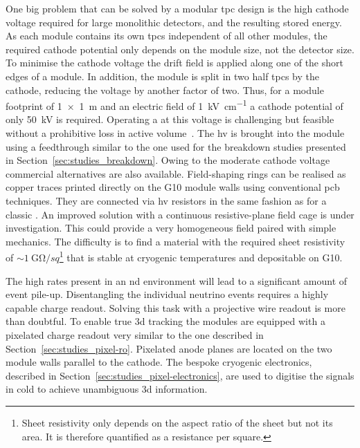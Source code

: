 One big problem that can be solved by a modular \gls{tpc} design is the high cathode voltage required for large monolithic detectors, and the resulting stored energy.
As each module contains its own \glspl{tpc} independent of all other modules, the required cathode potential only depends on the module size, not the detector size.
To minimise the cathode voltage the drift field is applied along one of the short edges of a module.
In addition, the module is split in two half \glspl{tpc} by the cathode, reducing the voltage by another factor of two.
Thus, for a module footprint of \SI{1 x 1}{\metre} and an electric field of \SI{1}{\kilo\volt\per\centi\metre} a cathode potential of only \SI{50}{\kilo\volt} is required.
Operating a \lartpc{} at this voltage is challenging but feasible without a prohibitive loss in active volume~\cite{AT}.
The \gls{hv} is brought into the module using a feedthrough similar to the one used for the breakdown studies presented in Section~\ref{sec:studies_breakdown}.
Owing to the moderate cathode voltage commercial alternatives are also available.
Field-shaping rings can be realised as copper traces printed directly on the G10 module walls using conventional \gls{pcb} techniques.
They are connected via \gls{hv} resistors in the same fashion as for a classic \lartpc{}.
An improved solution with a continuous resistive-plane field cage is under investigation.
This could provide a very homogeneous field paired with simple mechanics.
The difficulty is to find a material with the required sheet resistivity of $\sim{\SI{1}{\giga\ohm\per sq}}$\footnote{Sheet resistivity only depends on the aspect ratio of the sheet but not its area. It is therefore quantified as a resistance per square.} that is stable at cryogenic temperatures and depositable on G10.

The high rates present in an \gls{nd} environment will lead to a significant amount of event pile-up.
Disentangling the individual neutrino events requires a highly capable charge readout.
Solving this task with a projective wire readout is more than doubtful.
To enable true \gls{3d} tracking the modules are equipped with a pixelated charge readout very similar to the one described in Section~\ref{sec:studies_pixel-ro}.
Pixelated anode planes are located on the two module walls parallel to the cathode.
The bespoke \larpix{} cryogenic electronics, described in Section~\ref{sec:studies_pixel-electronics}, are used to digitise the signals in cold to achieve unambiguous \gls{3d} information.

